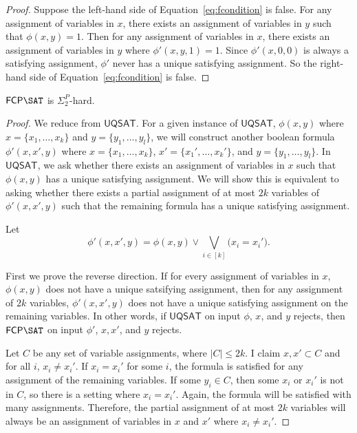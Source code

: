 \documentclass[runningheads,a4paper]{llncs}
\newcommand{\UQSAT}{\mathsf{UQSAT}}
\begin{document}
\begin{proof}
Suppose the left-hand side of Equation~\ref{eq:fcondition} is false. For any assignment of variables in $x$, there exists an assignment of variables in $y$ such that $\phi(x, y) = 1$. Then for any assignment of variables in $x$, there exists an assignment of variables in $y$ where $\phi'(x, y, 1) = 1$. Since $\phi'(x, 0, 0)$ is always a satisfying assignment, $\phi'$ never has a unique satisfying assignment. So the right-hand side of Equation~\ref{eq:fcondition} is false. 
\end{proof}

\begin{proposition}
\label{prop:fcpsatsigmacomp}
$\mathsf{FCP} \SAT$ is $\Sigma_2^P$-hard.
\end{proposition}

\begin{proof}
We reduce from $\UQSAT$. For a given instance of $\UQSAT$, $\phi(x, y)$ where $x = \{ x_1, \dots, x_k\}$ and $y = \{ y_1, \dots, y_l\}$, we will construct another boolean formula $\phi'(x, x', y)$ where $x = \{ x_1, \dots, x_k\}$, $x' = \{ x_1', \dots, x_k'\}$, and $y = \{ y_1, \dots, y_l\}$. In $\UQSAT$, we ask whether there exists an assignment of variables in $x$ such that $\phi(x, y)$ has a unique satisfying assignment. We will show this is equivalent to asking whether there exists a partial assignment of at most $2k$ variables of $\phi'(x, x', y)$ such that the remaining formula has a unique satisfying assignment.

Let
\begin{equation}
\phi'(x, x', y) = \phi(x,y) \vee \bigvee_{i \in [k]} \big( x_i = x_i' \big).
\end{equation}

First we prove the reverse direction. If for every assignment of variables in $x$, $\phi(x,y)$ does not have a unique satsifying assignment, then for any assignment of $2k$ variables, $\phi'(x,x',y)$ does not have a unique satisfying assignment on the remaining variables. In other words, if $\UQSAT$ on input $\phi$, $x$, and $y$ rejects, then $\mathsf{FCP} \SAT$ on input $\phi'$, $x, x'$, and $y$ rejects. 
 
Let $C$ be any set of variable assignments, where $|C| \leq 2k$. I claim $x, x' \subset C$ and for all $i$, $x_i \neq x_i'$. If $x_i = x_i'$ for some $i$, the formula is satisfied for any assignment of the remaining variables. If some $y_i \in C$, then some $x_i$ or $x_i'$ is not in $C$, so there is a setting where $x_i = x_i'$. Again, the formula will be satisfied with many assignments. Therefore, the partial assignment of at most $2k$ variables will always be an assignment of variables in $x$ and $x'$ where $x_i \neq x_i'$. 


\end{proof}
\end{document}
